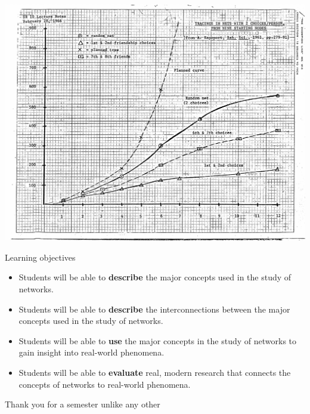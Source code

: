 \documentclass[aspectratio=169]{beamer}
\begin{document}
\begin{frame}

\begin{center}
\includegraphics[height=0.9\textheight]{figures/white_classnotes_swt}
\end{center}


\end{frame}
\begin{frame}

\begin{center}
\Large{Learning objectives}
\end{center}

\end{frame}
\begin{frame}

\begin{itemize}
\item Students will be able to \textbf{describe} the major concepts used in the study of networks.
\pause
\item Students will be able to \textbf{describe} the interconnections between the major concepts used in the study of networks.
\pause
\item Students will be able to \textbf{use} the major concepts in the study of networks to gain insight into real-world phenomena.
\pause
\item Students will be able to \textbf{evaluate} real, modern research that connects the concepts of networks to real-world phenomena.
\end{itemize}


\end{frame}
\begin{frame}

Thank you for a semester unlike any other

\end{frame}
\end{document}
